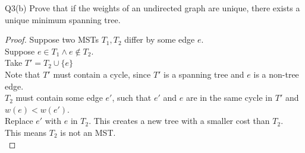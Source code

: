 \begin{problem}
  {Q3(b)}
  Prove that if the weights of an undirected graph are unique, there exists a unique minimum spanning tree.
  \begin{proof}
    Suppose two MSTs $T_1, T_2$ differ by some edge $e$. \\
    Suppose $e \in T_1 \land e \not\in T_2$. \\
    Take $T' = T_2 \cup \{e\}$ \\
    Note that $T'$ must contain a cycle, since $T'$ is a spanning tree and $e$ is a non-tree edge. \\
    $T_2$ must contain some edge $e'$, such that $e'$ and $e$ are in the same cycle in $T'$ and $w(e) < w(e')$. \\
    Replace $e'$ with $e$ in $T_2$. This creates a new tree with a smaller cost than $T_2$. \\
    This means $T_2$ is not an MST. \\
  \end{proof}
\end{problem}
